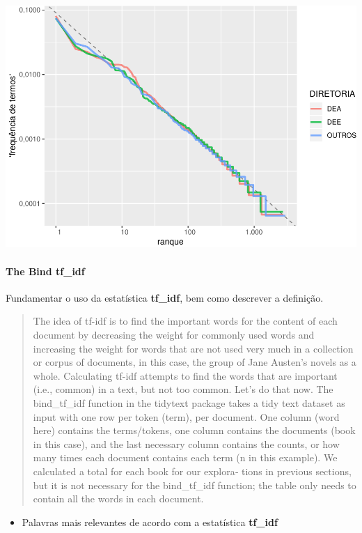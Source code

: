 \documentclass[]{article}
\providecommand{\tightlist}{%
  \setlength{\itemsep}{0pt}\setlength{\parskip}{0pt}}
\let\oldparagraph\paragraph
\renewcommand{\paragraph}[1]{\oldparagraph{#1}\mbox{}}
\begin{document}
\includegraphics{markdown_v40_files/figure-latex/unnamed-chunk-31-1.pdf}

\paragraph{\texorpdfstring{The Bind
\textbf{tf\_idf}}{The Bind tf\_idf}}\label{the-bind-tf_idf}

Fundamentar o uso da estatística \textbf{tf\_idf}, bem como descrever a
definição.

\begin{quote}
The idea of tf-idf is to find the important words for the content of
each document by decreasing the weight for commonly used words and
increasing the weight for words that are not used very much in a
collection or corpus of documents, in this case, the group of Jane
Austen's novels as a whole. Calculating tf-idf attempts to find the
words that are important (i.e., common) in a text, but not too common.
Let's do that now. The bind\_tf\_idf function in the tidytext package
takes a tidy text dataset as input with one row per token (term), per
document. One column (word here) contains the terms/tokens, one column
contains the documents (book in this case), and the last necessary
column contains the counts, or how many times each document contains
each term (n in this example). We calculated a total for each book for
our explora‐ tions in previous sections, but it is not necessary for the
bind\_tf\_idf function; the table only needs to contain all the words in
each document.
\end{quote}

\begin{itemize}
\tightlist
\item
  Palavras mais relevantes de acordo com a estatística \textbf{tf\_idf}
\end{itemize}
\end{document}
